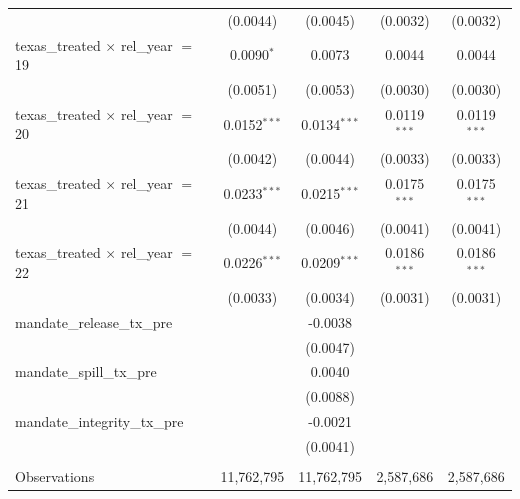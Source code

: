 \begin{tabular}{lcccc}
                                                & (0.0044)        & (0.0045)            & (0.0032)               & (0.0032)\\   
   texas\_treated $\times$ rel\_year $=$ 19     & 0.0090$^{*}$    & 0.0073              & 0.0044                 & 0.0044\\   
                                                & (0.0051)        & (0.0053)            & (0.0030)               & (0.0030)\\   
   texas\_treated $\times$ rel\_year $=$ 20     & 0.0152$^{***}$  & 0.0134$^{***}$      & 0.0119$^{***}$         & 0.0119$^{***}$\\   
                                                & (0.0042)        & (0.0044)            & (0.0033)               & (0.0033)\\   
   texas\_treated $\times$ rel\_year $=$ 21     & 0.0233$^{***}$  & 0.0215$^{***}$      & 0.0175$^{***}$         & 0.0175$^{***}$\\   
                                                & (0.0044)        & (0.0046)            & (0.0041)               & (0.0041)\\   
   texas\_treated $\times$ rel\_year $=$ 22     & 0.0226$^{***}$  & 0.0209$^{***}$      & 0.0186$^{***}$         & 0.0186$^{***}$\\   
                                                & (0.0033)        & (0.0034)            & (0.0031)               & (0.0031)\\   
   mandate\_release\_tx\_pre                    &                 & -0.0038             &                        &   \\   
                                                &                 & (0.0047)            &                        &   \\   
   mandate\_spill\_tx\_pre                      &                 & 0.0040              &                        &   \\   
                                                &                 & (0.0088)            &                        &   \\   
   mandate\_integrity\_tx\_pre                  &                 & -0.0021             &                        &   \\   
                                                &                 & (0.0041)            &                        &   \\   
    \\
   Observations                                 & 11,762,795      & 11,762,795          & 2,587,686              & 2,587,686\\  

\end{tabular}
